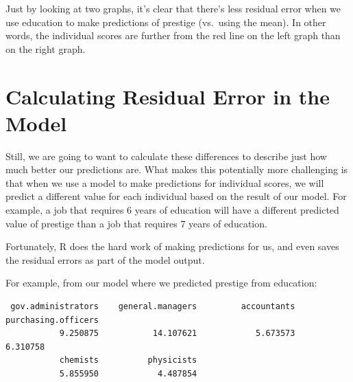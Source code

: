 \documentclass[
  letterpaper,
  DIV=11,
  numbers=noendperiod,
  oneside]{scrreprt}
\newenvironment{Shaded}{\begin{snugshade}}{\end{snugshade}}
\newcommand{\CommentTok}[1]{\textcolor[rgb]{0.37,0.37,0.37}{#1}}
\newcommand{\DecValTok}[1]{\textcolor[rgb]{0.68,0.00,0.00}{#1}}
\newcommand{\FunctionTok}[1]{\textcolor[rgb]{0.28,0.35,0.67}{#1}}
\newcommand{\NormalTok}[1]{\textcolor[rgb]{0.00,0.23,0.31}{#1}}
\newcommand{\SpecialCharTok}[1]{\textcolor[rgb]{0.37,0.37,0.37}{#1}}
\begin{document}
Just by looking at two graphs, it's clear that there's less residual
error when we use education to make predictions of prestige (vs.~using
the mean). In other words, the individual scores are further from the
red line on the left graph than on the right graph.

\section{Calculating Residual Error in the
Model}\label{calculating-residual-error-in-the-model}

Still, we are going to want to calculate these differences to describe
just how much better our predictions are. What makes this potentially
more challenging is that when we use a model to make predictions for
individual scores, we will predict a different value for each individual
based on the result of our model. For example, a job that requires 6
years of education will have a different predicted value of prestige
than a job that requires 7 years of education.

Fortunately, R does the hard work of making predictions for us, and even
saves the residual errors as part of the model output.

For example, from our model where we predicted prestige from education:

\begin{Shaded}
\end{Shaded}

\begin{verbatim}
 gov.administrators    general.managers         accountants purchasing.officers 
           9.250875           14.107621            5.673573            6.310758 
           chemists          physicists 
           5.855950            4.487854 
\end{verbatim}

\begin{Shaded}
\end{Shaded}
\end{document}
